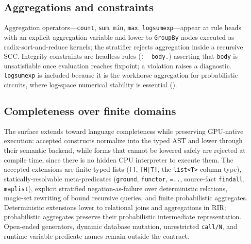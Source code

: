 \subsection{Aggregations and constraints}\label{sec:lang:agg}

Aggregation operators---\texttt{count}, \texttt{sum}, \texttt{min}, \texttt{max}, \texttt{logsumexp}---appear at rule heads with an explicit aggregation variable and lower to \texttt{GroupBy} nodes executed as radix-sort-and-reduce kernels; the stratifier rejects aggregation inside a recursive SCC. Integrity constraints are headless rules (\texttt{:- body.}) asserting that \texttt{body} is unsatisfiable once evaluation reaches fixpoint; a violation raises a diagnostic. \texttt{logsumexp} is included because it is the workhorse aggregation for probabilistic circuits, where log-space numerical stability is essential ().



\subsection{Completeness over finite domains}\label{sec:lang:completeness}

The surface extends toward language completeness while preserving GPU-native execution: accepted constructs normalize into the typed AST and lower through their semantic backend, while forms that cannot be lowered safely are rejected at compile time, since there is no hidden CPU interpreter to execute them. The accepted extensions are finite typed lists (\texttt{[]}, \texttt{[H|T]}, the \texttt{list<T>} column type), statically-resolvable meta-predicates (\texttt{ground}, \texttt{functor}, \texttt{=..}, source-fact \texttt{findall}, \texttt{maplist}), explicit stratified negation-as-failure over deterministic relations, magic-set rewriting of bound recursive queries, and finite probabilistic aggregates. Deterministic extensions lower to relational joins and aggregations in RIR; probabilistic aggregates preserve their probabilistic intermediate representation. Open-ended generators, dynamic database mutation, unrestricted \texttt{call/N}, and runtime-variable predicate names remain outside the contract.
